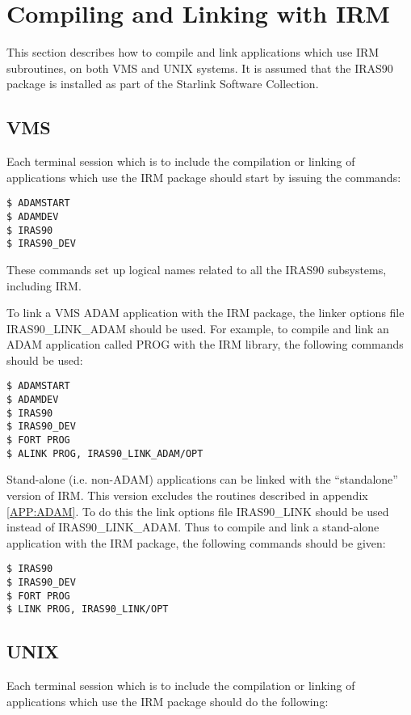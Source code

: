 \section {Compiling and Linking with IRM}
\label{SEC:LINK}
This section describes how to compile and link applications which use IRM
subroutines, on both VMS and UNIX systems. It is assumed that the IRAS90 package
is installed as part of the Starlink Software Collection.

\subsection{VMS}
Each terminal session which is to include the compilation or linking of
applications which use the IRM package should start by issuing the commands:

\begin{verbatim}
$ ADAMSTART
$ ADAMDEV
$ IRAS90
$ IRAS90_DEV
\end{verbatim}

These commands set up logical names related to all the IRAS90
subsystems, including IRM.

To link a VMS ADAM application with the IRM package, the linker options file
IRAS90\_LINK\_ADAM should be used. For example, to compile and link an ADAM
application called PROG with the IRM library, the following commands should be
used:

\begin{verbatim}
$ ADAMSTART
$ ADAMDEV
$ IRAS90
$ IRAS90_DEV
$ FORT PROG
$ ALINK PROG, IRAS90_LINK_ADAM/OPT
\end{verbatim}

Stand-alone (i.e. non-ADAM) applications can be linked with the ``standalone''
version of IRM. This version excludes the routines described in appendix
\ref{APP:ADAM}. To do this the link options file IRAS90\_LINK should be used
instead of IRAS90\_LINK\_ADAM. Thus to compile and link a stand-alone
application with the IRM package, the following commands should be given:

\begin{verbatim}
$ IRAS90
$ IRAS90_DEV
$ FORT PROG
$ LINK PROG, IRAS90_LINK/OPT
\end{verbatim}

\subsection{UNIX}

Each terminal session which is to include the compilation or linking of
applications which use the IRM package should do the following:

